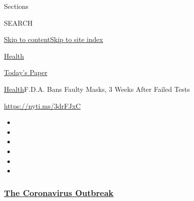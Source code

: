 Sections

SEARCH

\protect\hyperlink{site-content}{Skip to
content}\protect\hyperlink{site-index}{Skip to site index}

\href{https://www.nytimes3xbfgragh.onion/section/health}{Health}

\href{https://myaccount.nytimes3xbfgragh.onion/auth/login?response_type=cookie\&client_id=vi}{}

\href{https://www.nytimes3xbfgragh.onion/section/todayspaper}{Today's
Paper}

\href{/section/health}{Health}\textbar{}F.D.A. Bans Faulty Masks, 3
Weeks After Failed Tests

\url{https://nyti.ms/3drFJxC}

\begin{itemize}
\item
\item
\item
\item
\item
\item
\end{itemize}

\hypertarget{the-coronavirus-outbreak}{%
\subsubsection{\texorpdfstring{\href{https://www.nytimes3xbfgragh.onion/news-event/coronavirus?name=styln-coronavirus-national\&region=TOP_BANNER\&block=storyline_menu_recirc\&action=click\&pgtype=Article\&impression_id=45784e50-f4bd-11ea-9a28-53af4ab06a19\&variant=undefined}{The
Coronavirus
Outbreak}}{The Coronavirus Outbreak}}\label{the-coronavirus-outbreak}}

